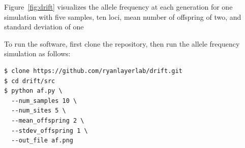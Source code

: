 \documentclass[11pt, letterpaper]{article}
\begin{document}
Figure~\ref{fig:drift} visualizes the allele frequency at each generation for
one simulation with five samples, ten loci, mean number of offspring of two,
and standard deviation of one

To run the software, first clone the repository, then run the allele frequency
simulation as follows:
\begin{verbatim}
$ clone https://github.com/ryanlayerlab/drift.git
$ cd drift/src
$ python af.py \
  --num_samples 10 \
  --num_sites 5 \
  --mean_offspring 2 \
  --stdev_offspring 1 \
  --out_file af.png
\end{verbatim}
\end{document}
